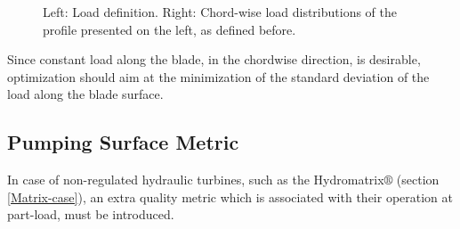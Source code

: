 \begin{figure}[h!]
\begin{minipage}[b]{0.5\linewidth}
 \centering
\end{minipage}
\begin{minipage}[b]{0.5\linewidth}
 \centering
\end{minipage}
\caption{Left: Load definition. Right: Chord-wise load distributions of the profile presented on the left, as defined before.}
\label{design-obj}
\end{figure}

Since constant load along the blade, in the chordwise direction, is desirable, optimization should aim at the minimization of the standard deviation of the load along the blade surface. 


\subsection{Pumping Surface Metric}
In case of non-regulated hydraulic turbines, such as the Hydromatrix$\circledR$ (section \ref{Matrix-case}), an extra quality metric which is associated with their operation at part-load, must be introduced.      

